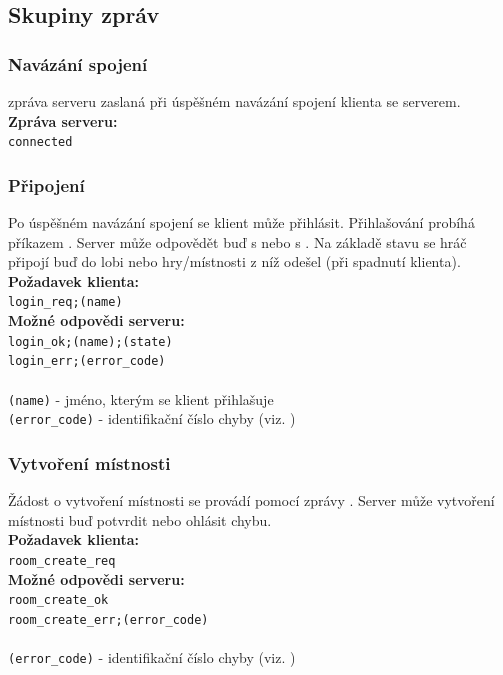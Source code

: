 \documentclass[12pt, a4paper]{article} %
\begin{document}
	\subsection{Skupiny zpráv}
	\subsubsection{Navázání spojení}
	\par {} zpráva serveru zaslaná při úspěšném navázání spojení klienta se serverem.\\
	\textbf{Zpráva serveru:}\\
	\texttt{connected}\\
	\subsubsection{Připojení}
	\par Po úspěšném navázání spojení se klient může přihlásit. Přihlašování probíhá příkazem  . Server může odpovědět buď s  nebo s . Na základě stavu se hráč připojí buď do lobi nebo hry/místnosti z níž odešel (při spadnutí klienta).\\
	\textbf{Požadavek klienta:}\\
	\texttt{login\_req;(name)}\\
	\textbf{Možné odpovědi serveru:}\\
	\texttt{login\_ok;(name);(state)}\\
	\texttt{login\_err;(error\_code)}\\\\
	\texttt{(name)} - jméno, kterým se klient přihlašuje\\
	\texttt{(error\_code)} - identifikační číslo chyby (viz. )
	
	\subsubsection{Vytvoření místnosti}
	\par Žádost o vytvoření místnosti se provádí pomocí zprávy . Server může vytvoření místnosti buď potvrdit nebo ohlásit chybu.\\
	\textbf{Požadavek klienta:}\\
	\texttt{room\_create\_req}\\
	\textbf{Možné odpovědi serveru:}\\
	\texttt{room\_create\_ok}\\
	\texttt{room\_create\_err;(error\_code)}\\\\
	\texttt{(error\_code)} - identifikační číslo chyby (viz. )
\end{document}

